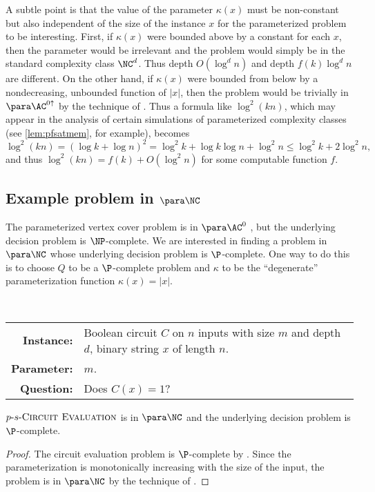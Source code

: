 A subtle point is that the value of the parameter $\kappa(x)$ must be non-constant but also independent of the size of the instance $x$ for the parameterized problem to be interesting.
First, if $\kappa(x)$ were bounded above by a constant for each $x$, then the parameter would be irrelevant and the problem would simply be in the standard complexity class $\NC^d$.
Thus depth $O(\log^d n)$ and depth $f(k) \log^d n$ are different.
On the other hand, if $\kappa(x)$ were bounded from below by a nondecreasing, unbounded function of $|x|$, then the problem would be trivially in $\para \AC^{0 \uparrow}$ by the technique of \autocite[Proposition~1.7]{fg06}.
Thus a formula like $\log^2 (kn)$, which may appear in the analysis of certain simulations of parameterized complexity classes (see \autoref{lem:pfsatmem}, for example), becomes
\[
\log^2 (kn) = (\log k + \log n)^2 = \log^2 k + \log k \log n + \log^2 n \leq \log^2 k + 2 \log^2 n,
\]
and thus $\log^2 (kn) = f(k) + O(\log^2 n)$ for some computable function $f$.

\subsection{Example problem in \texorpdfstring{$\para \NC$}{paraNC}}

The parameterized vertex cover problem is in $\para \AC^0$ \autocite{bst15}, but the underlying decision problem is $\NP$-complete.
We are interested in finding a problem in $\para \NC$ whose underlying decision problem is $\P$-complete.
One way to do this is to choose $Q$ to be a $\P$-complete problem and $\kappa$ to be the ``degenerate'' parameterization function $\kappa(x) = |x|$.

\begin{definition}
  \mbox{} \\
  \begin{tabular}{r p{9.2cm}}
    \textbf{Instance:} & Boolean circuit $C$ on $n$ inputs with size $m$ and depth $d$, binary string $x$ of length $n$. \\
    \textbf{Parameter:} & $m$. \\
    \textbf{Question:} & Does $C(x) = 1$?
  \end{tabular}
\end{definition}

\begin{theorem}
  $p \textnormal{-} s \textnormal{-} \textsc{Circuit Evaluation}$ is in $\para \NC$ and the underlying decision problem is $\P$-complete.
\end{theorem}
\begin{proof}
  The circuit evaluation problem is $\P$-complete by \autocite{ladner75}.
  Since the parameterization is monotonically increasing with the size of the input, the problem is in $\para \NC$ by the technique of \autocite[Proposition~1.7]{fg06}.
\end{proof}

